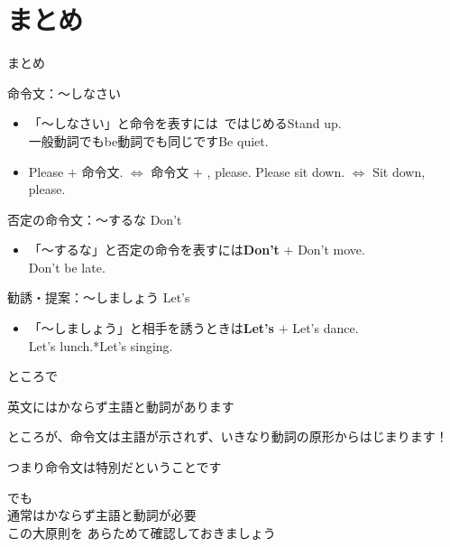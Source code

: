 \documentclass[aspectratio=169,xcolor={dvipsnames,table}]{beamer}
\begin{document}
\section{まとめ}
\begin{frame}[plain]{まとめ}

 \begin{block}{命令文：～しなさい}

\begin{itemize}[square]\small
 \item 「～しなさい」と命令を表すには\,\,\,ではじめる\hfill{\scriptsize Stand up.}\\
{\scriptsize 一般動詞でもbe動詞でも同じです}\hfill{\scriptsize Be quiet.}\\
 \item Please $+$ 命令文. $\Longleftrightarrow$ 命令文 $+$ , please.%
\hfill{\scriptsize Please sit down. $\Longleftrightarrow$ Sit down, please.}\\
\end{itemize}
  \end{block}


\begin{block}{否定の命令文：～するな Don't }
\begin{itemize}[square]\small
 \item 「～するな」と否定の命令を表すには\textbf{Don't} $+$ \hfill{\scriptsize Don't move.}\\
\hfill{\scriptsize Don't be late.}
 \end{itemize}
    \end{block}

\begin{block}{勧誘・提案：～しましょう Let's }
\begin{itemize}[square]\small
 \item 「～しましょう」と相手を誘うときは\textbf{Let's} $+$ \hfill{\scriptsize Let's dance.}\\
\hfill{\scriptsize *Let's lunch.\hspace{20pt}*Let's singing.}
 \end{itemize}
     \end{block}
\hfill{\scriptsize {}}
\end{frame}
\begin{frame}[plain]{ところで}

\textdbend

 英文にはかならず主語と動詞があります\pause

ところが、命令文は主語が示されず、いきなり動詞の原形からはじまります！\pause

つまり命令文は特別だということです\pause

\bigskip

でも\\
通常はかならず主語と動詞が必要\\
この大原則を
あらためて確認しておきましょう
\end{frame}
\end{document}
